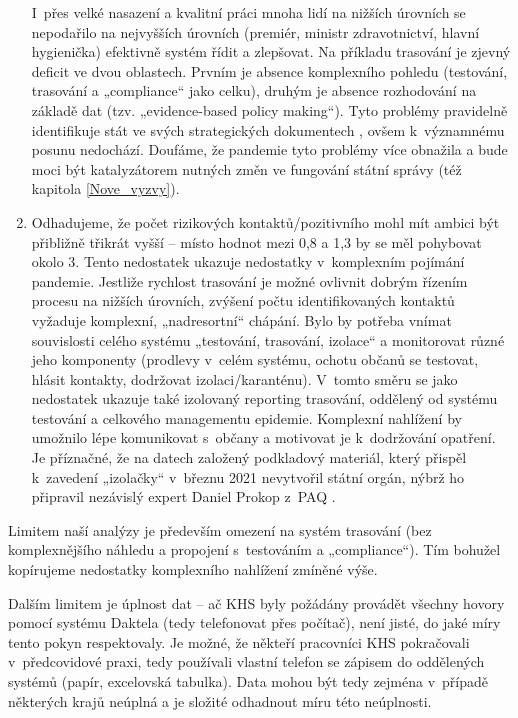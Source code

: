 \begin{enumerate}
I~přes velké nasazení a kvalitní práci mnoha lidí na nižších úrovních se nepodařilo na nejvyšších úrovních (premiér, ministr zdravotnictví, hlavní hygienička) efektivně systém řídit a zlepšovat. Na příkladu trasování je zjevný deficit ve dvou oblastech. Prvním je absence komplexního pohledu (testování, trasování a „compliance“ jako celku), druhým je absence rozhodování na základě dat (tzv. „evidence-based policy making“). Tyto problémy pravidelně identifikuje stát ve svých strategických dokumentech \cite{tr_MVCR, tr_MZP}, ovšem k~významnému posunu nedochází. Doufáme, že pandemie tyto problémy více obnažila a bude moci být katalyzátorem nutných změn ve fungování státní správy (též kapitola \ref{Nove_vyzvy}).
\item Odhadujeme, že počet rizikových kontaktů/pozitivního mohl mít ambici být přibližně třikrát vyšší -- místo hodnot mezi 0,8 a 1,3 by se měl pohybovat okolo 3. Tento nedostatek ukazuje nedostatky v~komplexním pojímání pandemie. Jestliže rychlost trasování je možné ovlivnit dobrým řízením procesu na nižších úrovních, zvýšení počtu identifikovaných kontaktů vyžaduje komplexní, „nadresortní“ chápání. Bylo by potřeba vnímat souvislosti celého systému „testování, trasování, izolace“ a monitorovat různé jeho komponenty (prodlevy v~celém systému, ochotu občanů se
testovat, hlásit kontakty, dodržovat izolaci/karanténu). V~tomto směru se jako nedostatek ukazuje také izolovaný reporting trasování, oddělený od systému testování a celkového managementu epidemie. Komplexní nahlížení by umožnilo
lépe komunikovat s~občany a motivovat je k~dodržování opatření. Je příznačné, že na datech založený podkladový materiál, který přispěl k~zavedení „izolačky“ \cite{tr_MPSV} v~březnu 2021 nevytvořil státní orgán, nýbrž ho připravil nezávislý expert Daniel Prokop z~PAQ \cite{tr_PAQ02}.
\end{enumerate}

Limitem naší analýzy je především omezení na systém trasování (bez komplexnějšího náhledu a propojení s~testováním a „compliance“). Tím bohužel kopírujeme nedostatky komplexního nahlížení zmíněné výše.

Dalším limitem je úplnost dat -- ač KHS byly požádány provádět všechny hovory pomocí systému Daktela (tedy telefonovat přes počítač), není jisté, do jaké míry tento pokyn respektovaly. Je možné, že někteří pracovníci KHS pokračovali v~předcovidové praxi, tedy používali vlastní telefon se zápisem do oddělených systémů (papír, excelovská tabulka). Data mohou být tedy zejména v~případě některých krajů neúplná a je složité odhadnout míru této neúplnosti.

